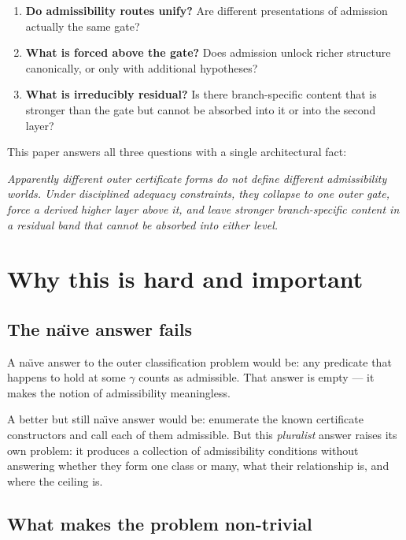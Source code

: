\documentclass[11pt]{article}
\theoremstyle{plain}
\theoremstyle{definition}
\theoremstyle{remark}
\begin{document}
\begin{enumerate}[label=(\arabic*)]
  \item \textbf{Do admissibility routes unify?}
    Are different presentations of admission actually the same gate?
  \item \textbf{What is forced above the gate?}
    Does admission unlock richer structure canonically, or only with
    additional hypotheses?
  \item \textbf{What is irreducibly residual?}
    Is there branch-specific content that is stronger than the gate but
    cannot be absorbed into it or into the second layer?
\end{enumerate}

This paper answers all three questions with a single architectural fact:

\begin{keybox}
\centering
\emph{Apparently different outer certificate forms do not define different
admissibility worlds.  Under disciplined adequacy constraints, they collapse
to one outer gate, force a derived higher layer above it, and leave stronger
branch-specific content in a residual band that cannot be absorbed into
either level.}
\end{keybox}

\section{Why this is hard and important}
\label{sec:importance}

\subsection{The na\"{\i}ve answer fails}

A na\"{\i}ve answer to the outer classification problem would be: any
predicate that happens to hold at some $\gamma$ counts as admissible.
That answer is empty --- it makes the notion of admissibility meaningless.

A better but still na\"{\i}ve answer would be: enumerate the known
certificate constructors and call each of them admissible.  But this
\emph{pluralist} answer raises its own problem: it produces a collection of
admissibility conditions without answering whether they form one class or
many, what their relationship is, and where the ceiling is.

\subsection{What makes the problem non-trivial}
\end{document}
